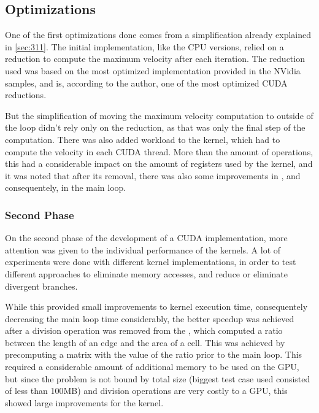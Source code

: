 \subsection{Optimizations}
\label{subsec:cuda:load}

One of the first optimizations done comes from a simplification already explained in \cref{sec:311}. The initial implementation, like the CPU versions, relied on a reduction to compute the maximum velocity after each iteration. The reduction used was based on the most optimized implementation provided in the NVidia samples, and is, according to the author, one of the most optimized CUDA reductions.

But the simplification of moving the maximum velocity computation to outside of the loop didn't rely only on the reduction, as that was only the final step of the computation. There was also added workload to the \computeflux kernel, which had to compute the velocity in each CUDA thread. More than the amount of operations, this had a considerable impact on the amount of registers used by the kernel, and it was noted that after its removal, there was also some improvements in \computeflux, and consequentely, in the main loop.

\subsubsection{Second Phase}
\label{subsubsec:cuda:load:second}

On the second phase of the development of a CUDA implementation, more attention was given to the individual performance of the kernels. A lot of experiments were done with different kernel implementations, in order to test different approaches to eliminate memory accesses, and reduce or eliminate divergent branches.

While this provided small improvements to kernel execution time, consequentely decreasing the main loop time considerably, the better speedup was achieved after a division operation was removed from the \update, which computed a ratio between the length of an edge and the area of a cell. This was achieved by precomputing a matrix with the value of the ratio prior to the main loop. This required a considerable  amount of additional memory to be used on the GPU, but since the problem is not bound by total size (biggest test case used consisted of less than 100MB) and division operations are very costly to a GPU, this showed large improvements for the \update kernel.

